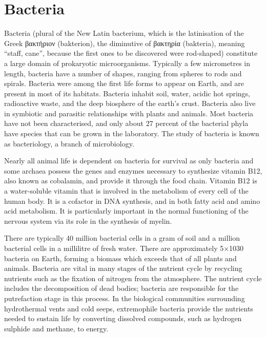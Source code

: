 \hypertarget{bacteria}{%
\section{Bacteria}\label{bacteria}}

Bacteria (plural of the New Latin bacterium, which is the latinisation of the Greek βακτήριον (bakterion), the diminutive of βακτηρία (bakteria), meaning ``staff, cane'', because the first ones to be discovered were rod-shaped) constitute a large domain of prokaryotic microorganisms. Typically a few micrometres in length, bacteria have a number of shapes, ranging from spheres to rods and spirals. Bacteria were among the first life forms to appear on Earth, and are present in most of its habitats. Bacteria inhabit soil, water, acidic hot springs, radioactive waste, and the deep biosphere of the earth's crust. Bacteria also live in symbiotic and parasitic relationships with plants and animals. Most bacteria have not been characterised, and only about 27 percent of the bacterial phyla have species that can be grown in the laboratory. The study of bacteria is known as bacteriology, a branch of microbiology.

Nearly all animal life is dependent on bacteria for survival as only bacteria and some archaea possess the genes and enzymes necessary to synthesize vitamin B12, also known as cobalamin, and provide it through the food chain. Vitamin B12 is a water-soluble vitamin that is involved in the metabolism of every cell of the human body. It is a cofactor in DNA synthesis, and in both fatty acid and amino acid metabolism. It is particularly important in the normal functioning of the nervous system via its role in the synthesis of myelin.

There are typically 40 million bacterial cells in a gram of soil and a million bacterial cells in a millilitre of fresh water. There are approximately 5×1030 bacteria on Earth, forming a biomass which exceeds that of all plants and animals. Bacteria are vital in many stages of the nutrient cycle by recycling nutrients such as the fixation of nitrogen from the atmosphere. The nutrient cycle includes the decomposition of dead bodies; bacteria are responsible for the putrefaction stage in this process. In the biological communities surrounding hydrothermal vents and cold seeps, extremophile bacteria provide the nutrients needed to sustain life by converting dissolved compounds, such as hydrogen sulphide and methane, to energy.

